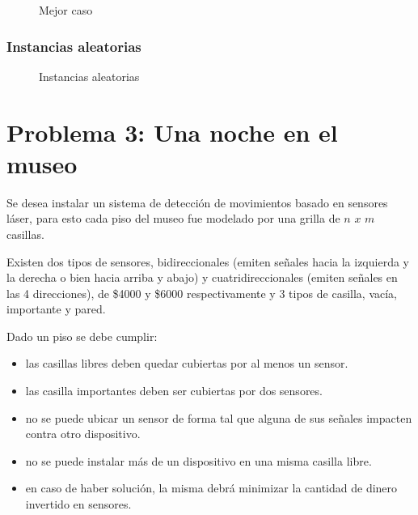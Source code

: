 \documentclass[a4paper, 10pt, twoside]{article}
\newcommand{\tresgraficos}[3]{
    \newcommand{\separacion}{-2.2em}
    \vspace{\separacion}
    
    \vspace{\separacion}
    
    \vspace{\separacion}
    
}
\begin{document}
\begin{figure}[H]
  \centering
  \tresgraficos{problema2-mejor-caso}
               {problema2-mejor-caso-logn}
               {problema2-mejor-caso-n}
  \caption{Mejor caso}
\end{figure}


\subsubsection{Instancias aleatorias}

\begin{figure}[H]
  \centering
  \tresgraficos{problema2-instancias-aleatorias}
               {problema2-instancias-aleatorias-logn}
               {problema2-instancias-aleatorias-n}
  \caption{Instancias aleatorias}
\end{figure}




\newpage

\section{Problema 3: Una noche en el museo}
Se desea instalar un sistema de detección de movimientos basado en sensores láser, para esto cada piso del museo fue modelado por una grilla de $n$ $x$ $m$ casillas.

Existen dos tipos de sensores, bidireccionales (emiten señales hacia la izquierda y la derecha o bien hacia arriba y abajo) y cuatridireccionales (emiten señales en las 4 direcciones), de \$4000 y \$6000 respectivamente y 3 tipos de casilla, vacía, importante y pared.

Dado un piso se debe cumplir:

\begin{itemize}
\item las casillas libres deben quedar cubiertas por al menos un sensor.
\item las casilla importantes deben ser cubiertas por dos sensores.
\item no se puede ubicar un sensor de forma tal que alguna de sus señales impacten contra otro dispositivo.
\item no se puede instalar más de un dispositivo en una misma casilla libre.
\item en caso de haber solución, la misma debrá minimizar la cantidad de dinero invertido en sensores.
\end{itemize}
\end{document}
